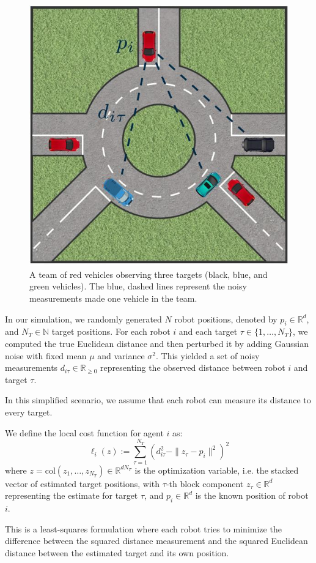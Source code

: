 \begin{figure}[h!]
    \centering
    \includegraphics[width=0.45\linewidth]{report/figs/cooperative_localization_scenario.jpg}
    \caption{A team of red vehicles observing three targets (black, blue, and green vehicles). The blue, dashed lines represent the noisy measurements made one vehicle in the team.}
    \label{fig:cooperative_localization_scenario}
\end{figure}

In our simulation, we randomly generated $N$ robot positions, denoted by $p_i \in \mathbb{R}^d$, and $N_T \in \mathbb{N}$ target positions. For each robot $i$ and each target $\tau \in \{1, \ldots, N_T\}$, we computed the true Euclidean distance and then perturbed it by adding Gaussian noise with fixed mean $\mu$ and variance $\sigma^2$. This yielded a set of noisy measurements $d_{i\tau} \in \mathbb{R}_{\geq 0}$ representing the observed distance between robot $i$ and target $\tau$.

In this simplified scenario, we assume that each robot can measure its distance to every target.

We define the local cost function for agent $i$ as:
\[
\ell_i(z) := \sum_{\tau=1}^{N_T} \left( d_{i\tau}^2 - \| z_\tau - p_i \|^2 \right)^2
\]
where $z = \mathrm{col}(z_1, \ldots, z_{N_T}) \in \mathbb{R}^{d N_T}$ is the optimization variable, i.e. the stacked vector of estimated target positions, with $\tau$-th block component $z_\tau \in \mathbb{R}^d$ representing the estimate for target $\tau$, and $p_i \in \mathbb{R}^d$ is the known position of robot $i$.

This is a least-squares formulation where each robot tries to minimize the difference between the squared distance measurement and the squared Euclidean distance between the estimated target and its own position.

\medskip

